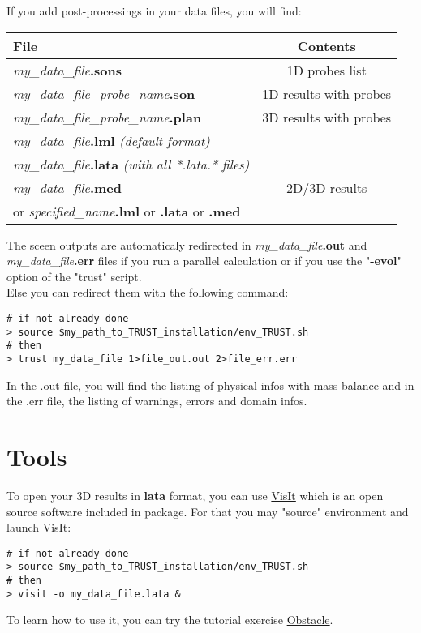 If you add post-processings in your data files, you will find:

\begin{longtable}{|l|c|}
\hline \textbf{File}                                    & \textbf{Contents} \\ \hline \hline
\textit{my\_data\_file}\textbf{.sons}                          & 1D probes list \\ \hline
\textit{my\_data\_file\_probe\_name}\textbf{.son}              & 1D results with probes \\ \hline
\textit{my\_data\_file\_probe\_name}\textbf{.plan}             & 3D results with probes\\ \hline
\textit{my\_data\_file}\textbf{.lml} \textit{(default format)}             & \\
\textit{my\_data\_file}\textbf{.lata} \textit{(with all *.lata.* files)}   & \\
\textit{my\_data\_file}\textbf{.med}                                       & 2D/3D results \\
or \textit{specified\_name}\textbf{.lml} or \textbf{.lata} or \textbf{.med}  & \\ \hline
\end{longtable}

The sceen outputs are automaticaly redirected in \textit{my\_data\_file}\textbf{.out} and \textit{my\_data\_file}\textbf{.err} files if you run a parallel calculation or if you use the "\textbf{-evol}" option of the "trust" script.\\
Else you can redirect them with the following command:
\begin{verbatim}
# if not already done
> source $my_path_to_TRUST_installation/env_TRUST.sh
# then
> trust my_data_file 1>file_out.out 2>file_err.err
\end{verbatim}

In the .out file, you will find the listing of physical infos with mass balance and in the .err file, the listing of warnings, errors and domain infos.




\section{Tools}

To open your 3D results in \textbf{lata} format, you can use \href{https://wci.llnl.gov/simulation/computer-codes/visit}{VisIt} which is an open source software included in \trust package. For that you may "source" \trust environment and launch VisIt:
\begin{verbatim}
# if not already done
> source $my_path_to_TRUST_installation/env_TRUST.sh
# then
> visit -o my_data_file.lata &
\end{verbatim}
To learn how to use it, you can try the tutorial exercise \href{TRUST_tutorial.pdf\#exo1}{Obstacle}. \\

